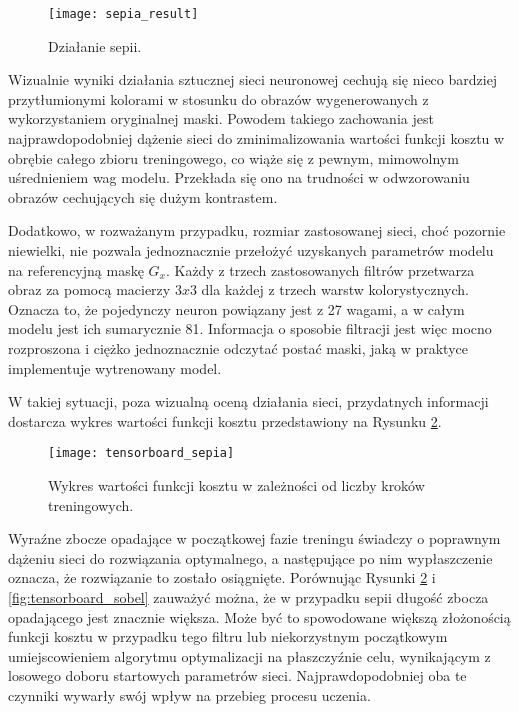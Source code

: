     \begin{figure}[h!]
      \centering
      \texttt{[image: sepia\_result]}
      \caption[Działanie sepii - źródło: Rysunek własny]{Działanie sepii.}
      \label{fig:sepia_result}
    \end{figure}

    Wizualnie wyniki działania sztucznej sieci neuronowej cechują się nieco bardziej
    przytłumionymi kolorami w stosunku do obrazów wygenerowanych z wykorzystaniem
    oryginalnej maski. Powodem takiego zachowania jest najprawdopodobniej dążenie
    sieci do zminimalizowania wartości funkcji kosztu w obrębie całego zbioru
    treningowego, co wiąże się z pewnym, mimowolnym uśrednieniem wag modelu. Przekłada
    się ono na trudności w odwzorowaniu obrazów cechujących się dużym kontrastem.

    Dodatkowo, w rozważanym przypadku, rozmiar zastosowanej sieci, choć pozornie
    niewielki, nie pozwala jednoznacznie przełożyć uzyskanych parametrów modelu na
    referencyjną maskę $G_x$. Każdy z trzech zastosowanych filtrów przetwarza
    obraz za pomocą macierzy $3x3$ dla każdej z trzech warstw kolorystycznych.
    Oznacza to, że pojedynczy neuron powiązany jest z 27 wagami, a w całym modelu
    jest ich sumarycznie 81. Informacja o sposobie filtracji jest więc mocno
    rozproszona i ciężko jednoznacznie odczytać postać maski, jaką w praktyce
    implementuje wytrenowany model.

    W takiej sytuacji, poza wizualną oceną działania sieci, przydatnych informacji
    dostarcza wykres wartości funkcji kosztu przedstawiony na Rysunku \ref{fig:tensorboard_sepia}.

    \begin{figure}[h!]
      \centering
      \texttt{[image: tensorboard\_sepia]}
      \caption[Wykres wartości funkcji kosztu w zależności od liczby kroków treningowych - źródło: Rysunek własny]{Wykres wartości funkcji kosztu w zależności od liczby kroków treningowych.}
      \label{fig:tensorboard_sepia}
    \end{figure}

    Wyraźne zbocze opadające w początkowej fazie treningu świadczy o poprawnym dążeniu
    sieci do rozwiązania optymalnego, a następujące po nim wypłaszczenie oznacza, że
    rozwiązanie to zostało osiągnięte. Porównując Rysunki \ref{fig:tensorboard_sepia}
    i \ref{fig:tensorboard_sobel} zauważyć można, że w przypadku sepii długość zbocza
    opadającego jest znacznie większa. Może być to spowodowane większą złożonością
    funkcji kosztu w przypadku tego filtru lub niekorzystnym początkowym umiejscowieniem
    algorytmu optymalizacji na płaszczyźnie celu, wynikającym z losowego doboru startowych parametrów sieci.
    Najprawdopodobniej oba te czynniki wywarły swój wpływ na przebieg procesu uczenia.

